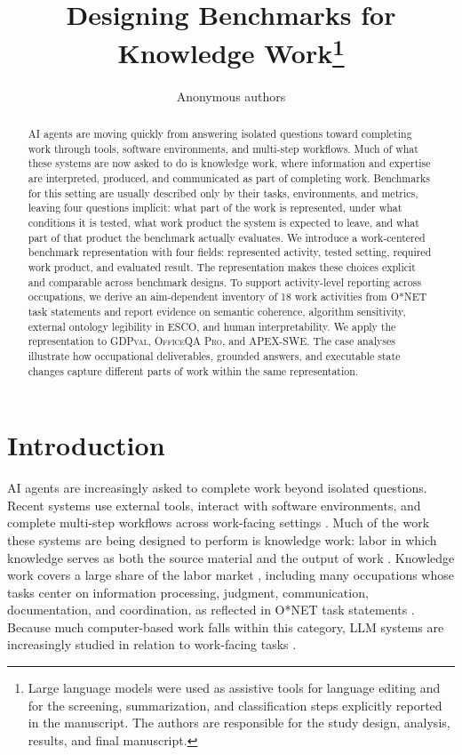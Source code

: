 \documentclass[10pt]{article}
\title{Designing Benchmarks for Knowledge Work\thanks{Large language models were used as assistive tools for language editing and for the screening, summarization, and classification steps explicitly reported in the manuscript. The authors are responsible for the study design, analysis, results, and final manuscript.}}
\author{Anonymous authors}
\begin{document}
\maketitle

\begin{abstract}
AI agents are moving quickly from answering isolated questions toward completing work through tools, software environments, and multi-step workflows. Much of what these systems are now asked to do is knowledge work, where information and expertise are interpreted, produced, and communicated as part of completing work. Benchmarks for this setting are usually described only by their tasks, environments, and metrics, leaving four questions implicit: what part of the work is represented, under what conditions it is tested, what work product the system is expected to leave, and what part of that product the benchmark actually evaluates. We introduce a work-centered benchmark representation with four fields: represented activity, tested setting, required work product, and evaluated result. The representation makes these choices explicit and comparable across benchmark designs. To support activity-level reporting across occupations, we derive an aim-dependent inventory of 18 work activities from O{*}NET task statements and report evidence on semantic coherence, algorithm sensitivity, external ontology legibility in ESCO, and human interpretability. We apply the representation to \textsc{GDPval}, \textsc{OfficeQA Pro}, and \textsc{APEX-SWE}. The case analyses illustrate how occupational deliverables, grounded answers, and executable state changes capture different parts of work within the same representation.
\end{abstract}

\section{Introduction}

AI agents are increasingly asked to complete work beyond isolated questions. Recent systems use external tools, interact with software environments, and complete multi-step workflows across work-facing settings \citep{wang2024survey}.
Much of the work these systems are being designed to perform is knowledge work: labor in which knowledge serves as both the source material and the output of work \citep{drucker1999productivity,davenport2005thinking}.
Knowledge work covers a large share of the labor market \citep{porat1977information}, including many occupations whose tasks center on information processing, judgment, communication, documentation, and coordination, as reflected in O{*}NET task statements \citep{onet2024tasks}.
Because much computer-based work falls within this category, LLM systems are increasingly studied in relation to work-facing tasks \citep{eloundou2023gpts,brynjolfsson2023genai}.
\end{document}
